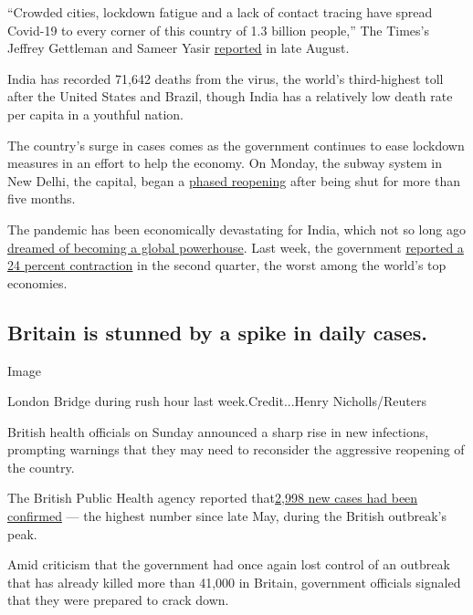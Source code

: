 ``Crowded cities, lockdown fatigue and a lack of contact tracing have
spread Covid-19 to every corner of this country of 1.3 billion people,''
The Times's Jeffrey Gettleman and Sameer Yasir
\href{https://www.nytimes3xbfgragh.onion/2020/08/28/world/asia/india-coronavirus.html}{reported}
in late August.

India has recorded 71,642 deaths from the virus, the world's
third-highest toll after the United States and Brazil, though India has
a relatively low death rate per capita in a youthful nation.

The country's surge in cases comes as the government continues to ease
lockdown measures in an effort to help the economy. On Monday, the
subway system in New Delhi, the capital, began a
\href{http://www.delhimetrorail.com/press_reldetails.aspx?id=YEUIu1E8HMklld}{phased
reopening} after being shut for more than five months.

The pandemic has been economically devastating for India, which not so
long ago
\href{https://www.nytimes3xbfgragh.onion/2020/09/05/world/asia/india-economy-coronavirus.html}{dreamed
of becoming a global powerhouse}. Last week, the government
\href{https://www.nytimes3xbfgragh.onion/2020/08/31/world/asia/india-economy-gdp.html}{reported
a 24 percent contraction} in the second quarter, the worst among the
world's top economies.

\hypertarget{britain-is-stunned-by-a-spike-in-daily-cases}{%
\subsection{Britain is stunned by a spike in daily
cases.}\label{britain-is-stunned-by-a-spike-in-daily-cases}}

Image

London Bridge during rush hour last week.Credit...Henry Nicholls/Reuters

British health officials on Sunday announced a sharp rise in new
infections, prompting warnings that they may need to reconsider the
aggressive reopening of the country.

The British Public Health agency reported
that\href{https://coronavirus.data.gov.uk/?_ga=2.212010196.1361742393.1599439298-600955461.1599439298}{2,998
new cases had been confirmed} --- the highest number since late May,
during the British outbreak's peak.

Amid criticism that the government had once again lost control of an
outbreak that has already killed more than 41,000 in Britain, government
officials signaled that they were prepared to crack down.

